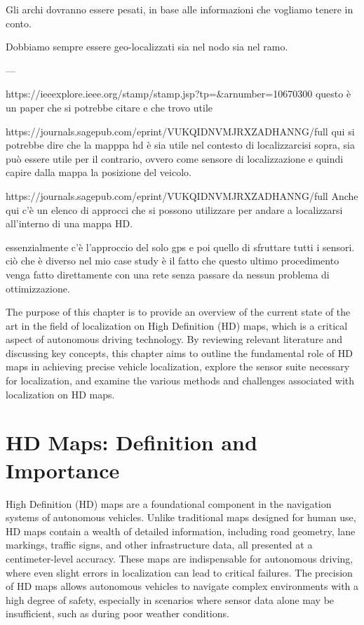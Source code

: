 Gli archi dovranno essere pesati, in base alle informazioni che vogliamo tenere in conto. 

Dobbiamo sempre essere geo-localizzati sia nel nodo sia nel ramo.

---


https://ieeexplore.ieee.org/stamp/stamp.jsp?tp=&arnumber=10670300
questo è un paper che si potrebbe citare e che trovo utile 


https://journals.sagepub.com/eprint/VUKQIDNVMJRXZADHANNG/full
qui si potrebbe dire che la mapppa hd è sia utile nel contesto di localizzarcisi sopra, sia può essere utile per il contrario, ovvero come sensore di localizzazione e quindi capire dalla mappa la posizione del veicolo. 


https://journals.sagepub.com/eprint/VUKQIDNVMJRXZADHANNG/full
Anche qui c'è un elenco di approcci che si possono utilizzare per andare a localizzarsi all'interno di una mappa HD.

essenzialmente c'è l'approccio del solo gps e poi quello di sfruttare tutti i sensori. ciò che è diverso nel mio case study è il fatto che questo ultimo procedimento venga fatto direttamente con una rete senza passare da nessun problema di ottimizzazione.



The purpose of this chapter is to provide an overview of the current state of the art in the field of localization on High Definition (HD) maps, which is a critical aspect of autonomous driving technology. By reviewing relevant literature and discussing key concepts, this chapter aims to outline the fundamental role of HD maps in achieving precise vehicle localization, explore the sensor suite necessary for localization, and examine the various methods and challenges associated with localization on HD maps.

\section{HD Maps: Definition and Importance}
High Definition (HD) maps are a foundational component in the navigation systems of autonomous vehicles. Unlike traditional maps designed for human use, HD maps contain a wealth of detailed information, including road geometry, lane markings, traffic signs, and other infrastructure data, all presented at a centimeter-level accuracy. These maps are indispensable for autonomous driving, where even slight errors in localization can lead to critical failures. The precision of HD maps allows autonomous vehicles to navigate complex environments with a high degree of safety, especially in scenarios where sensor data alone may be insufficient, such as during poor weather conditions.

